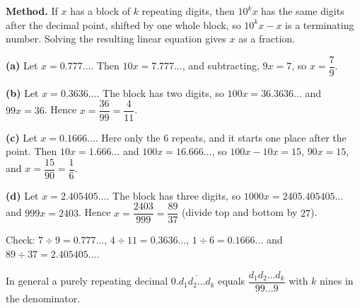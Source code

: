 \textbf{Method.} If $x$ has a block of $k$ repeating digits, then $10^kx$ has the same digits after the decimal point, shifted by one whole block, so $10^kx-x$ is a terminating number. Solving the resulting linear equation gives $x$ as a fraction.

\textbf{(a)} Let $x=0.777\ldots$. Then $10x=7.777\ldots$, and subtracting, $9x=7$, so $x=\boxed{\dfrac{7}{9}}$.

\textbf{(b)} Let $x=0.3636\ldots$. The block has two digits, so $100x=36.3636\ldots$ and $99x=36$. Hence $x=\dfrac{36}{99}=\boxed{\dfrac{4}{11}}$.

\textbf{(c)} Let $x=0.1666\ldots$. Here only the $6$ repeats, and it starts one place after the point. Then $10x=1.666\ldots$ and $100x=16.666\ldots$, so $100x-10x=15$, $90x=15$, and $x=\dfrac{15}{90}=\boxed{\dfrac{1}{6}}$.

\textbf{(d)} Let $x=2.405405\ldots$. The block has three digits, so $1000x=2405.405405\ldots$ and $999x=2403$. Hence $x=\dfrac{2403}{999}=\boxed{\dfrac{89}{37}}$ (divide top and bottom by $27$).

Check: $7\div9=0.777\ldots$, $4\div11=0.3636\ldots$, $1\div6=0.1666\ldots$ and $89\div37=2.405405\ldots$.

In general a purely repeating decimal $0.\overline{d_1d_2\ldots d_k}$ equals $\dfrac{d_1d_2\ldots d_k}{99\ldots9}$ with $k$ nines in the denominator.

